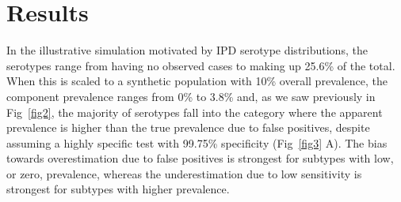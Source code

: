 \documentclass[10pt,letterpaper]{article}
\begin{document}
%

\section*{Results}

In the illustrative simulation motivated by IPD serotype distributions, the serotypes range from having no observed cases to making up 25.6\% of the total\cite{hyams2023a}. When this is scaled to a synthetic population with 10\% overall prevalence, the component prevalence ranges from 0\% to 3.8\% and, as we saw previously in Fig~\ref{fig2}, the majority of serotypes fall into the category where the apparent prevalence is higher than the true prevalence due to false positives, despite assuming a highly specific test with 99.75\% specificity (Fig~\ref{fig3} A). The bias towards overestimation due to false positives is strongest for subtypes with low, or zero, prevalence, whereas the underestimation due to low sensitivity is strongest for subtypes with higher prevalence. 
\end{document}

